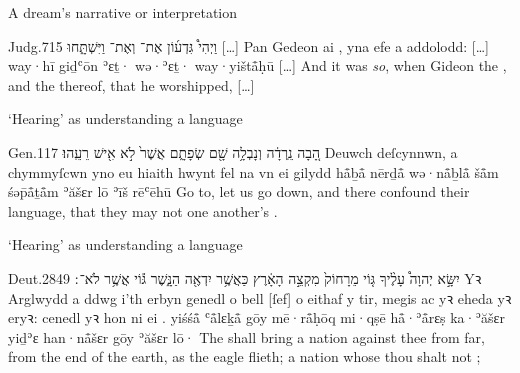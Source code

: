 \begin{frame}{\ex A dream’s narrative or interpretation}
	\begin{example}{Judg.}{7}{15}{}{}
		\quoling
		{וַיְהִי֩  גִּדְע֜וֹן אֶת־ וְאֶת־ וַיִּשְׁתָּ֑חוּ […]}%
		{Pan  Gedeon  ai , yna efe a addolodd: […]} %
		{way·hī  giḏʿōn ʾɛṯ· wə·ʾɛṯ· way·yištå̄ḥū […]}%
		{And it was \textit{so}, when Gideon  the , and the  thereof, that he worshipped, […]}%
	\end{example}
\end{frame}




\begin{frame}{\ex ‘Hearing’ as understanding a language}
	\begin{example}{Gen.}{11}{7}{}{}
		\quoling
		{הָ֚בָה נֵֽרְדָ֔ה וְנָבְלָ֥ה שָׁ֖ם שְׂפָתָ֑ם אֲשֶׁר֙ לֹ֣א  אִ֖ישׁ  רֵעֵֽהוּ׃}
		{Deuwch deſcynnwn, a chymmyſcwn yno eu hiaith hwynt fel na  vn  ei gilydd}
		{hå̄ḇå̄ nērḏå̄ wə·nå̄ḇlå̄ šå̄m śəp̄å̄ṯå̄m ʾăšɛr lō  ʾīš  rēʿēhū}
		{Go to, let us go down, and there confound their language, that they may not  one another’s .}
	\end{example}
\end{frame}


\begin{frame}{\ex ‘Hearing’ as understanding a language}
	\begin{example}{Deut.}{28}{49}{}{}
		\quoling
		{יִשָּׂ֣א יְהוָה֩ עָלֶ֨יךָ גּ֤וֹי מֵרָחוֹק֙ מִקְצֵ֣ה הָאָ֔רֶץ כַּאֲשֶׁ֥ר יִדְאֶ֖ה הַנָּ֑שֶׁר גּ֕וֹי אֲשֶׁ֥ר לֹא־ ׃}
		{Yꝛ Arglwydd a ddwg i’th erbyn genedl o bell [ſef] o eithaf y tir, megis ac yꝛ eheda yꝛ eryꝛ: cenedl yꝛ hon ni  ei .}
		{yiśśå̄ {\YHWH} ʿå̄lɛḵå̄ gōy mē·rå̄ḥōq mi·qṣē hå̄·ʾå̄rɛṣ ka·ʾăšɛr yiḏʾɛ han·nå̄šɛr gōy ʾăšɛr lō· }
		{The {\LORD} shall bring a nation against thee from far, from the end of the earth,  as the eagle flieth; a nation whose  thou shalt not ;}
	\end{example}
\end{frame}


